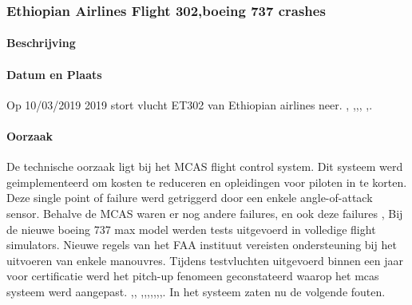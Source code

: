 \documentclass{article}
\begin{document}
	\subsubsection{Ethiopian Airlines Flight 302,boeing 737 crashes}
	
	\paragraph{Beschrijving}
		
	
	\paragraph{Datum en Plaats}
	\newline \indent  Op  10/03/2019 2019 stort vlucht ET302 van Ethiopian airlines neer.  \cite{gates18112020boeingcrisis},
	\cite{boeing737maxsoftwareprobles},\cite{avetisov19032019boeingmalwarestate},\cite{thompson23112020nationalsecurityboeing},
	\cite{wiki737maxgroundings},\cite{campbell02052019boengcrashhumanerrors}.
	
 
	\paragraph{Oorzaak}
	
	De technische oorzaak ligt bij het MCAS flight control system. Dit systeem werd geimplementeerd om kosten te reduceren en opleidingen voor piloten  in te korten.  Deze single point of failure \cite{uran05042019SPOF}
	werd getriggerd door een enkele angle-of-attack sensor\cite{boeing737maxdisplay}.
	Behalve de MCAS waren er nog andere failures\cite{fehrm24112020737changes}, en ook deze failures \cite{dohertylindeman15032019737problems}
	\cite{travis18042019737maxsoftwaredevop}, Bij de  nieuwe boeing 737 max model werden tests uitgevoerd in volledige flight simulators. Nieuwe   regels van het FAA instituut vereisten ondersteuning bij het uitvoeren van enkele manouvres. Tijdens testvluchten uitgevoerd binnen een jaar voor certificatie werd het pitch-up fenomeen geconstateerd waarop het mcas systeem werd aangepast. 
	\cite{hawkins22032019737maxairplanes},\cite{barnett05052019737maxcrisis}, \cite{thomas30082020737safest},\cite{boyle18112020737maxupgrade},\cite{bergstraburgess122019737maxMcasAlgorithm},\cite{737mcas},\cite{german190620217372yaftergrounded},\cite{beningo02052019boeinglessons},\cite{bloomberg26092019failedpred},\cite{afacwaLostSafeguards}.
	In het  systeem zaten nu de volgende fouten.
	
\end{document}
